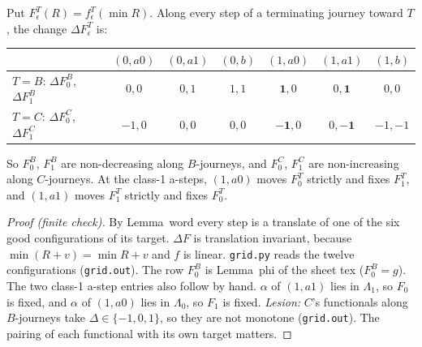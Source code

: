 \documentclass[11pt]{article}
\theoremstyle{definition}\newtheorem{definition}[theorem]{Definition}\newtheorem{remark}[theorem]{Remark}
\begin{document}
\begin{lemma}\label{lem:gridmono}
Put $F_\epsilon^T(R)=f_\epsilon^T(\min R)$. Along every step of a terminating journey toward $T$, the change $\Delta F_\epsilon^T$ is:
\begin{center}\small\begin{tabular}{lcccccc}\toprule
& $(0,a0)$ & $(0,a1)$ & $(0,b)$ & $(1,a0)$ & $(1,a1)$ & $(1,b)$\\\midrule
$T=B$: $\Delta F_0^B$, $\Delta F_1^B$ & $0,0$ & $0,1$ & $1,1$ & $\mathbf{1},0$ & $0,\mathbf{1}$ & $0,0$\\
$T=C$: $\Delta F_0^C$, $\Delta F_1^C$ & $-1,0$ & $0,0$ & $0,0$ & $\mathbf{-1},0$ & $0,\mathbf{-1}$ & $-1,-1$\\\bottomrule
\end{tabular}\end{center}
So $F_0^B$, $F_1^B$ are non-decreasing along $B$-journeys, and $F_0^C$, $F_1^C$ are non-increasing along $C$-journeys. At the class-1 a-steps, $(1,a0)$ moves $F_0^T$ strictly and fixes $F_1^T$, and $(1,a1)$ moves $F_1^T$ strictly and fixes $F_0^T$.
\end{lemma}
\begin{proof}[Proof (finite check)]
By Lemma~word every step is a translate of one of the six good configurations of its target. $\Delta F$ is translation invariant, because $\min(R+v)=\min R+v$ and $f$ is linear. \texttt{grid.py} reads the twelve configurations (\texttt{grid.out}). The row $F_0^B$ is Lemma~phi of the sheet tex ($F_0^B=g$). The two class-1 a-step entries also follow by hand. $\alpha$ of $(1,a1)$ lies in $\Lambda_1$, so $F_0$ is fixed, and $\alpha$ of $(1,a0)$ lies in $\Lambda_0$, so $F_1$ is fixed.
\emph{Lesion:} $C$'s functionals along $B$-journeys take $\Delta\in\{-1,0,1\}$, so they are not monotone (\texttt{grid.out}). The pairing of each functional with its own target matters.
\end{proof}
\end{document}
